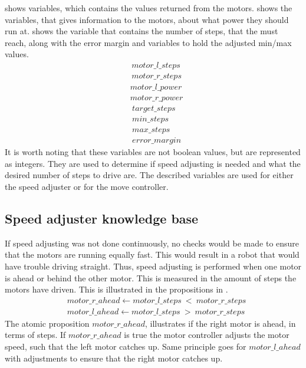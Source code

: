  shows variables, which contains the values returned from the motors.  shows the variables, that gives information to the motors, about what power they should run at.  shows the variable that contains the number of steps, that the \projname{} must reach, along with the error margin and variables to hold the adjusted min/max values.
\begin{equation} \label{eq:motorsteps}
\begin{split} 
& motor\_l\_steps \\
& motor\_r\_steps
\end{split}
\end{equation}
\begin{equation} \label{eq:motorpower}
\begin{split}
& motor\_l\_power \\
& motor\_r\_power
\end{split}
\end{equation}
\begin{equation} \label{eq:targetsteps}
\begin{split}
& target\_steps \\
& min\_steps \\
& max\_steps \\
& error\_margin
\end{split}
\end{equation}
It is worth noting that these variables are not boolean values, but are represented as integers. They are used to determine if speed adjusting is needed and what the desired number of steps to drive are. The described variables are used for either the speed adjuster or for the move controller. 


\subsection{Speed adjuster knowledge base}
If speed adjusting was not done continuously, no checks would be made to ensure that the motors are running equally fast. This would result in a robot that would have trouble driving straight. Thus, speed adjusting is performed when one motor is ahead or behind the other motor. This is measured in the amount of steps the motors have driven. This is illustrated in the propositions in .
\begin{equation} \label{eq:motorxahead}
\begin{split}
& motor\_r\_ahead \leftarrow motor\_l\_steps~<~motor\_r\_steps \\
& motor\_l\_ahead \leftarrow motor\_l\_steps~>~motor\_r\_steps
\end{split}
\end{equation}
The atomic proposition $motor\_r\_ahead$, illustrates if the right motor is ahead, in terms of steps. If $motor\_r\_ahead$ is true the motor controller adjusts the motor speed, such that the left motor catches up. Same principle goes for $motor\_l\_ahead$ with adjustments to ensure that the right motor catches up. 

